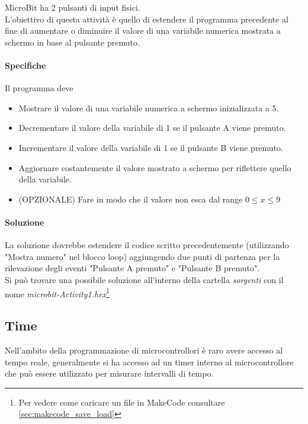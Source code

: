 \documentclass[../../docenti.tex]{subfiles}
\begin{document}
MicroBit ha 2 pulsanti di input fisici.\\
L'obiettivo di questa attività è quello di estendere il programma precedente al fine di aumentare o diminuire il valore di una variabile numerica mostrata a schermo in base al pulsante premuto.

\paragraph{Specifiche}
Il programma deve
\begin{itemize}
	\item Mostrare il valore di una variabile numerica a schermo inizializzata a 5.
	\item Decrementare il valore della variabile di 1 se il pulsante A viene premuto.
	\item Incrementare il valore della variabile di 1 se il pulsante B viene premuto.
	\item Aggiornare costantemente il valore mostrato a schermo per riflettere quello della variabile.
	\item (OPZIONALE) Fare in modo che il valore non esca dal range \(0\leq x \leq 9\)
\end{itemize}

\paragraph{Soluzione}
La soluzione dovrebbe estendere il codice scritto precedentemente (utilizzando "Mostra numero" nel blocco loop) aggiungendo due punti di partenza per la rilevazione degli eventi "Pulsante A premuto" e "Pulsante B premuto".\\
Si può trovare una possibile soluzione all'interno della cartella \textit{sorgenti} con il nome \textit{microbit-Activity1.hex}\footnote{Per vedere come caricare un file in MakeCode consultare \autoref{sec:makecode_save_load}}

\newpage
\subsection{Time}
Nell'ambito della programmazione di microcontrollori è raro avere accesso al tempo reale, generalmente si ha accesso ad un timer interno al microcontrollore che può essere utilizzato per misurare intervalli di tempo.
\end{document}
